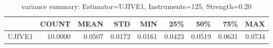 \begin{table}[ht]
\centering
\caption{variance summary: Estimator=UJIVE1, Instruments=125, Strength=0.20}
\begin{tabular}{lrrrrrrrr}
\toprule
 & COUNT & MEAN & STD & MIN & 25\% & 50\% & 75\% & MAX \\
\midrule
UJIVE1 & 10.0000 & 0.0507 & 0.0172 & 0.0161 & 0.0423 & 0.0519 & 0.0631 & 0.0734 \\
\bottomrule
\end{tabular}
\end{table}
